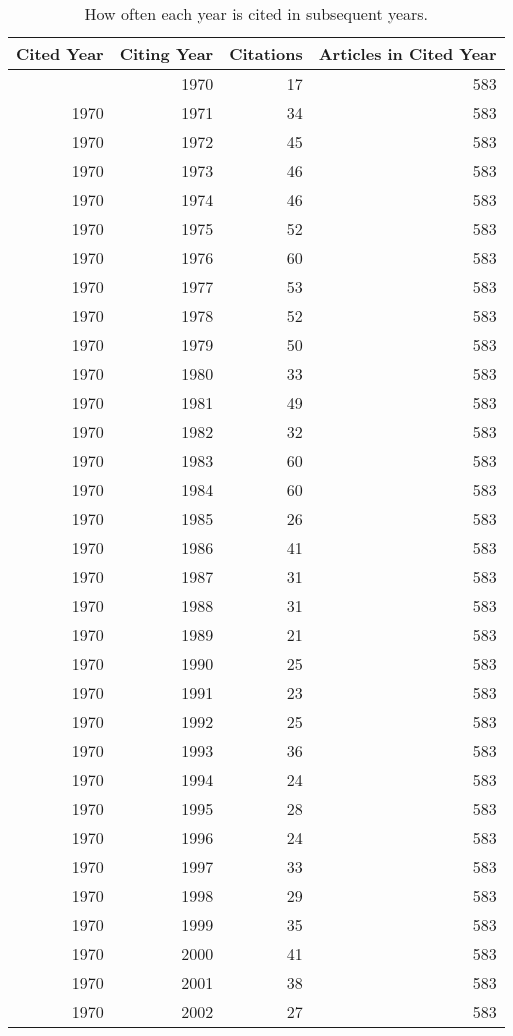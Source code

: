 \documentclass[
  11pt,
  letterpaper,
  DIV=11,
  numbers=noendperiod,
  twoside]{scrartcl}
\begin{document}
\begin{longtable}[]{@{}rrrr@{}}

\caption{\label{tbl-citation-count}How often each year is cited in
subsequent years.}

\tabularnewline

\toprule\noalign{}
Cited Year & Citing Year & Citations & Articles in Cited Year \\
\midrule\noalign{}
\endhead
\bottomrule\noalign{}
\endlastfoot
1970 & 1970 & 17 & 583 \\
1970 & 1971 & 34 & 583 \\
1970 & 1972 & 45 & 583 \\
1970 & 1973 & 46 & 583 \\
1970 & 1974 & 46 & 583 \\
1970 & 1975 & 52 & 583 \\
1970 & 1976 & 60 & 583 \\
1970 & 1977 & 53 & 583 \\
1970 & 1978 & 52 & 583 \\
1970 & 1979 & 50 & 583 \\
1970 & 1980 & 33 & 583 \\
1970 & 1981 & 49 & 583 \\
1970 & 1982 & 32 & 583 \\
1970 & 1983 & 60 & 583 \\
1970 & 1984 & 60 & 583 \\
1970 & 1985 & 26 & 583 \\
1970 & 1986 & 41 & 583 \\
1970 & 1987 & 31 & 583 \\
1970 & 1988 & 31 & 583 \\
1970 & 1989 & 21 & 583 \\
1970 & 1990 & 25 & 583 \\
1970 & 1991 & 23 & 583 \\
1970 & 1992 & 25 & 583 \\
1970 & 1993 & 36 & 583 \\
1970 & 1994 & 24 & 583 \\
1970 & 1995 & 28 & 583 \\
1970 & 1996 & 24 & 583 \\
1970 & 1997 & 33 & 583 \\
1970 & 1998 & 29 & 583 \\
1970 & 1999 & 35 & 583 \\
1970 & 2000 & 41 & 583 \\
1970 & 2001 & 38 & 583 \\
1970 & 2002 & 27 & 583 \\

\end{longtable}
\end{document}

